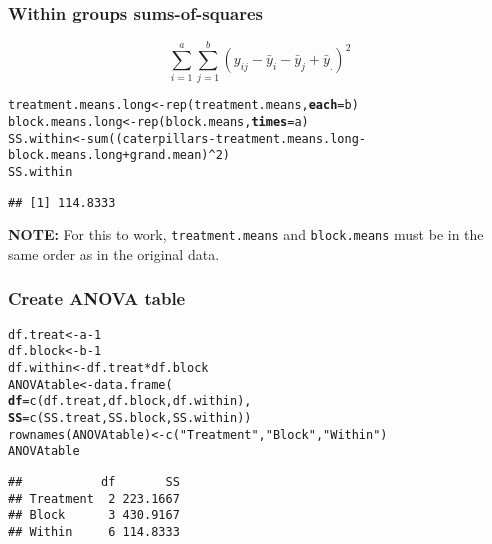 \documentclass[color=usenames,dvipsnames]{beamer}\usepackage[]{graphicx}\usepackage[]{color}
\makeatletter
\newcommand{\hlnum}[1]{\textcolor[rgb]{0.69,0.494,0}{#1}}%
\newcommand{\hlstr}[1]{\textcolor[rgb]{0.749,0.012,0.012}{#1}}%
\newcommand{\hlopt}[1]{\textcolor[rgb]{0,0,0}{#1}}%
\newcommand{\hlstd}[1]{\textcolor[rgb]{0,0,0}{#1}}%
\newcommand{\hlkwb}[1]{\textcolor[rgb]{0,0.341,0.682}{#1}}%
\newcommand{\hlkwc}[1]{\textcolor[rgb]{0,0,0}{\textbf{#1}}}%
\newcommand{\hlkwd}[1]{\textcolor[rgb]{0.004,0.004,0.506}{#1}}%
\newenvironment{kframe}{%
 \def\at@end@of@kframe{}%
 \ifinner\ifhmode%
  \def\at@end@of@kframe{\end{minipage}}%
  \begin{minipage}{\columnwidth}%
 \fi\fi%
 \def\FrameCommand##1{\hskip\@totalleftmargin \hskip-\fboxsep
 \colorbox{shadecolor}{##1}\hskip-\fboxsep
     \hskip-\linewidth \hskip-\@totalleftmargin \hskip\columnwidth}%
 \MakeFramed {\advance\hsize-\width
   \@totalleftmargin\z@ \linewidth\hsize
   \@setminipage}}%
 {\par\unskip\endMakeFramed%
 \at@end@of@kframe}
\newenvironment{knitrout}{}{} %
\newcommand{\inr}[1]{\colorbox{inlinecolor}{\texttt{#1}}}
\makeatother
\begin{document}
\begin{frame}[fragile]
  \frametitle{Within groups sums-of-squares}
  {\Large
    \[
    \sum_{i=1}^a \sum_{j=1}^b (y_{ij} - \bar{y}_i - \bar{y}_j + \bar{y}_.)^2
    \]
  }
\begin{knitrout}\small
{}\color{fgcolor}\begin{kframe}
\begin{alltt}
\hlstd{treatment.means.long} \hlkwb{<-} \hlkwd{rep}\hlstd{(treatment.means,} \hlkwc{each}\hlstd{=b)}
\hlstd{block.means.long} \hlkwb{<-} \hlkwd{rep}\hlstd{(block.means,} \hlkwc{times}\hlstd{=a)}
\hlstd{SS.within} \hlkwb{<-} \hlkwd{sum}\hlstd{((caterpillars} \hlopt{-} \hlstd{treatment.means.long} \hlopt{-}
                  \hlstd{block.means.long} \hlopt{+} \hlstd{grand.mean)}\hlopt{^}\hlnum{2}\hlstd{)}
\hlstd{SS.within}
\end{alltt}
\begin{verbatim}
## [1] 114.8333
\end{verbatim}
\end{kframe}
\end{knitrout}
\pause
\vfill
{\bf NOTE:} For this to work, \inr{treatment.means} and
\inr{block.means} must be in the same order as in the original
data. \\
\end{frame}






\begin{frame}[fragile]
  \frametitle{Create ANOVA table}
\begin{knitrout}\small
{}\color{fgcolor}\begin{kframe}
\begin{alltt}
\hlstd{df.treat} \hlkwb{<-} \hlstd{a}\hlopt{-}\hlnum{1}
\hlstd{df.block} \hlkwb{<-} \hlstd{b}\hlopt{-}\hlnum{1}
\hlstd{df.within} \hlkwb{<-} \hlstd{df.treat}\hlopt{*}\hlstd{df.block}
\hlstd{ANOVAtable} \hlkwb{<-} \hlkwd{data.frame}\hlstd{(}
    \hlkwc{df} \hlstd{=} \hlkwd{c}\hlstd{(df.treat, df.block, df.within),}
    \hlkwc{SS} \hlstd{=} \hlkwd{c}\hlstd{(SS.treat, SS.block, SS.within))}
\hlkwd{rownames}\hlstd{(ANOVAtable)} \hlkwb{<-} \hlkwd{c}\hlstd{(}\hlstr{"Treatment"}\hlstd{,} \hlstr{"Block"}\hlstd{,} \hlstr{"Within"}\hlstd{)}
\hlstd{ANOVAtable}
\end{alltt}
\begin{verbatim}
##           df       SS
## Treatment  2 223.1667
## Block      3 430.9167
## Within     6 114.8333
\end{verbatim}
\end{kframe}
\end{knitrout}
\end{frame}
\end{document}
